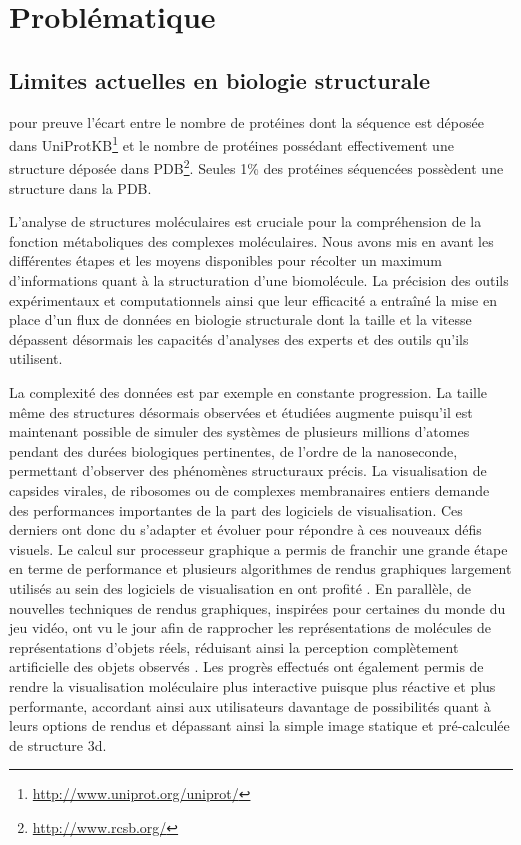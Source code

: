 \section{Problématique}

\subsection{Limites actuelles en biologie structurale}

pour preuve l'écart entre le nombre de protéines dont la séquence est déposée dans UniProtKB\footnote{\url{http://www.uniprot.org/uniprot/}} et le nombre de protéines possédant effectivement une structure déposée dans PDB\footnote{\url{http://www.rcsb.org/}}. Seules 1\% des protéines séquencées possèdent une structure dans la PDB.

L'analyse de structures moléculaires est cruciale pour la compréhension de la fonction métaboliques des complexes moléculaires. Nous avons mis en avant les différentes étapes et les moyens disponibles pour récolter un maximum d'informations quant à la structuration d'une biomolécule. La précision des outils expérimentaux et computationnels ainsi que leur efficacité a entraîné la mise en place d'un flux de données en biologie structurale dont la taille et la vitesse dépassent désormais les capacités d'analyses des experts et des outils qu'ils utilisent. 

La complexité des données est par exemple en constante progression. La taille même des structures désormais observées et étudiées augmente puisqu'il est maintenant possible de simuler des systèmes de plusieurs millions d'atomes pendant des durées biologiques pertinentes, de l'ordre de la nanoseconde, permettant d'observer des phénomènes structuraux précis. La visualisation de capsides virales, de ribosomes ou de complexes membranaires entiers demande des performances importantes de la part des logiciels de visualisation. Ces derniers ont donc du s'adapter et évoluer pour répondre à ces nouveaux défis visuels. Le calcul sur processeur graphique a permis de franchir une grande étape en terme de performance et plusieurs algorithmes de rendus graphiques largement utilisés au sein des logiciels de visualisation en ont profité \cite{chavent_gpu-powered_2011}. En parallèle, de nouvelles techniques de rendus graphiques, inspirées pour certaines du monde du jeu vidéo, ont vu le jour afin de rapprocher les représentations de molécules de représentations d'objets réels, réduisant ainsi la perception complètement artificielle des objets observés \cite{lv_game_2013}. Les progrès effectués ont également permis de rendre la visualisation moléculaire plus interactive puisque plus réactive et plus performante, accordant ainsi aux utilisateurs davantage de possibilités quant à leurs options de rendus et dépassant ainsi la simple image statique et pré-calculée de structure 3d.

